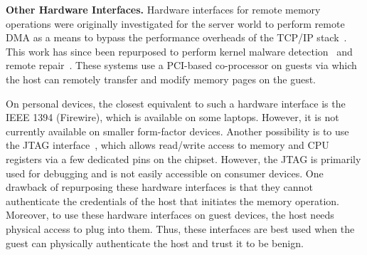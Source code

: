 \documentclass[pageno]{sig-alternate-05-2015}
\newcommand{\myparagraph}[1]{\indent\par\noindent\textsf{\textbf{#1.}}}
\newcommand{\eg}{\textit{e.g.,}}
\begin{document}
\myparagraph{Other Hardware Interfaces}
%
Hardware interfaces for remote memory operations were originally investigated
for the server world to perform remote DMA as a means to bypass the performance
overheads of the TCP/IP stack~\cite{mellanox,infiniband}.  This work has since
been repurposed to perform kernel malware detection~\cite{copilot:sec04} and
remote repair~\cite{backdoor:icac04}. These systems use a PCI-based
co-processor on guests via which the host can remotely transfer and modify
memory pages on the guest.

On personal devices, the closest equivalent to such a hardware interface is the
IEEE 1394 (Firewire), which is available on some laptops. However, it is not
currently available on smaller form-factor devices.  Another possibility is to
use the JTAG interface~\cite{jtag}, which allows read/write access to memory
and CPU registers via a few dedicated pins on the chipset.  However, the JTAG
is primarily used for debugging and is not easily accessible on consumer
devices.  One drawback of repurposing these hardware interfaces is that they
cannot authenticate the credentials of the host that initiates the memory
operation. Moreover, to use these hardware interfaces on guest devices, the
host needs physical access to plug into them.  Thus, these interfaces are best
used when the guest can physically authenticate the host and trust it to be
benign.


% 

\end{document}
